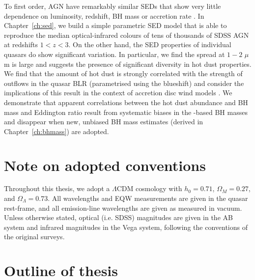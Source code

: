 To first order, AGN have remarkably similar SEDs that show very little dependence on luminosity, redshift, BH mass or accretion rate \citep[e.g.][]{elvis12,hao13}. 
In Chapter~\ref{ch:sed}, we build a simple parametric SED model that is able to reproduce the median optical-infrared colours of tens of thousands of SDSS AGN at redshifts $1<z<3$. 
On the other hand, the SED properties of individual quasars do show significant variation.
In particular, we find the spread at $1-2$ $\mu$m is large and suggests the presence of significant diversity in hot dust properties.
We find that the amount of hot dust is strongly correlated with the strength of outflows in the quasar BLR (parametrised using the  blueshift) and consider the implications of this result in the context of accretion disc wind models \citep[e.g.][]{elitzur06}.
We demonstrate that apparent correlations between the hot dust abundance and BH mass and Eddington ratio result from systematic biases in the -based BH masses and disappear when new, unbiased BH mass estimates (derived in Chapter~\ref{ch:bhmass}) are adopted. 

\section{Note on adopted conventions}

Throughout this thesis, we adopt a $\Lambda$CDM cosmology with $h_0=0.71$, $\Omega_M=0.27$, and $\Omega_\Lambda=0.73$. 
All wavelengths and EQW measurements are given in the quasar rest-frame, and all emission-line wavelengths are given as measured in vacuum.
Unless otherwise stated, optical (i.e. SDSS) magnitudes are given in the AB system and infrared magnitudes in the Vega system, following the conventions of the original surveys. 



\section{Outline of thesis}


